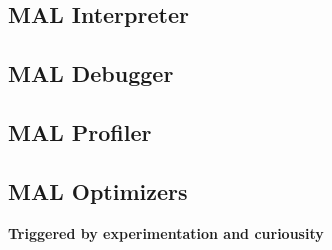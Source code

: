 \documentclass[11pt]{article}
\begin{document}
\subsection{MAL Interpreter}
\label{sec:orgb313ef1}

\subsection{MAL Debugger}
\label{sec:org885714d}

\subsection{MAL Profiler}
\label{sec:org48be40a}

\subsection{MAL Optimizers}
\label{sec:org1b4103c}
\textbf{Triggered by experimentation and curiousity}
\end{document}
